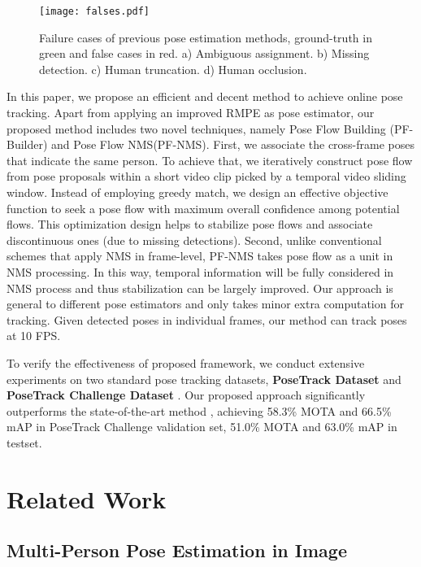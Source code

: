 \documentclass{bmvc2k}
\begin{document}
\vspace{-4mm}
\begin{figure}[!ht]
	\begin{center}
	\texttt{[image: falses.pdf]}
	\caption{Failure cases of previous pose estimation methods, ground-truth in green and false cases in red. a) Ambiguous assignment. b) Missing detection. c) Human truncation. d) Human occlusion.}
	\label{Figure:falses}
	\end{center}
\end{figure}
\vspace{-7mm}
In this paper, we propose an efficient and decent method to achieve online pose tracking. Apart from applying an improved RMPE\cite{fang2017rmpe} as pose estimator, our proposed method includes two novel techniques, namely Pose Flow Building (PF-Builder) and Pose Flow NMS(PF-NMS). First, we associate the cross-frame poses that indicate the same person. To achieve that, we iteratively construct pose flow from pose proposals within a short video clip picked by a temporal video sliding window. Instead of employing greedy match, we design an effective objective function to seek a pose flow with maximum overall confidence among potential flows. This optimization design helps to stabilize pose flows and associate discontinuous ones (due to missing detections). Second, unlike conventional schemes that apply NMS in frame-level, PF-NMS takes pose flow as a unit in NMS processing. In this way, temporal information will be fully considered in NMS process and thus stabilization can be largely improved. Our approach is general to different pose estimators and only takes minor extra computation for tracking. Given detected poses in individual frames, our method can track poses at 10 FPS. 

To verify the effectiveness of proposed framework, we conduct extensive experiments on two standard pose tracking datasets, \textbf{PoseTrack Dataset} \cite{iqbal2017posetrack} and \textbf{PoseTrack Challenge Dataset} \cite{andriluka2017posetrack}. Our proposed approach significantly outperforms the state-of-the-art method  \cite{girdhar2017detect}, achieving 58.3\% MOTA and 66.5\% mAP in PoseTrack Challenge validation set, 51.0\% MOTA and 63.0\% mAP in testset. 

\section{Related Work}

\subsection{Multi-Person Pose Estimation in Image}
\end{document}
